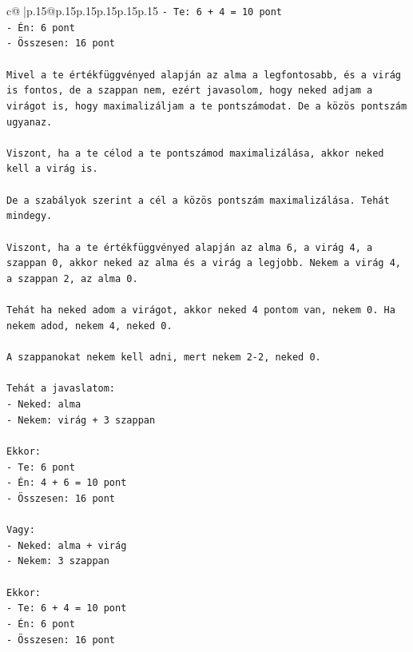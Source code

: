 \documentclass{article}
\begin{document}
{\begin{supertabular}{c@{$\;$}|p{.15\linewidth}@{}p{.15\linewidth}p{.15\linewidth}p{.15\linewidth}p{.15\linewidth}p{.15\linewidth}}
{{{\texttt{{-} Te: 6 + 4 = 10 pont} \\
\texttt{{-} Én: 6 pont} \\
\texttt{{-} Összesen: 16 pont} \\
\\ 
\texttt{Mivel a te értékfüggvényed alapján az alma a legfontosabb, és a virág is fontos, de a szappan nem, ezért javasolom, hogy neked adjam a virágot is, hogy maximalizáljam a te pontszámodat. De a közös pontszám ugyanaz.} \\
\\ 
\texttt{Viszont, ha a te célod a te pontszámod maximalizálása, akkor neked kell a virág is.} \\
\\ 
\texttt{De a szabályok szerint a cél a közös pontszám maximalizálása. Tehát mindegy.} \\
\\ 
\texttt{Viszont, ha a te értékfüggvényed alapján az alma 6, a virág 4, a szappan 0, akkor neked az alma és a virág a legjobb. Nekem a virág 4, a szappan 2, az alma 0.} \\
\\ 
\texttt{Tehát ha neked adom a virágot, akkor neked 4 pontom van, nekem 0. Ha nekem adod, nekem 4, neked 0.} \\
\\ 
\texttt{A szappanokat nekem kell adni, mert nekem 2{-}2, neked 0.} \\
\\ 
\texttt{Tehát a javaslatom:} \\
\texttt{{-} Neked: alma} \\
\texttt{{-} Nekem: virág + 3 szappan} \\
\\ 
\texttt{Ekkor:} \\
\texttt{{-} Te: 6 pont} \\
\texttt{{-} Én: 4 + 6 = 10 pont} \\
\texttt{{-} Összesen: 16 pont} \\
\\ 
\texttt{Vagy:} \\
\texttt{{-} Neked: alma + virág} \\
\texttt{{-} Nekem: 3 szappan} \\
\\ 
\texttt{Ekkor:} \\
\texttt{{-} Te: 6 + 4 = 10 pont} \\
\texttt{{-} Én: 6 pont} \\
\texttt{{-} Összesen: 16 pont} \\
}}}
\end{supertabular}}
\end{document}
